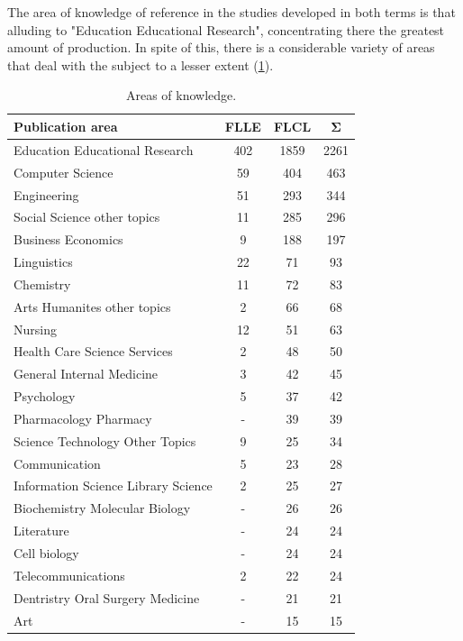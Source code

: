 \documentclass{textolivre}
\begin{document}
The area of knowledge of reference in the studies developed in both terms is that alluding to "Education Educational Research", concentrating there the greatest amount of production. In spite of this, there is a considerable variety of areas that deal with the subject to a lesser extent (\cref{tbl-tabela-05}).

\begin{table}[htpb]
\caption{Areas of knowledge.}
\label{tbl-tabela-05}
\centering
\begin{tabular}{lccc}
\toprule
\textbf{Publication area} & \textbf{FLLE} & \textbf{FLCL} & \textbf{Σ} \\ 
\midrule
Education Educational Research      & 402 & 1859 & 2261 \\ 
Computer Science                    & 59  & 404  & 463  \\ 
Engineering                         & 51  & 293  & 344  \\ 
Social Science other topics         & 11  & 285  & 296  \\ 
Business Economics                  & 9   & 188  & 197  \\ 
Linguistics                         & 22  & 71   & 93   \\ 
Chemistry                           & 11  & 72   & 83   \\ 
Arts Humanites other topics         & 2   & 66   & 68   \\ 
Nursing                             & 12  & 51   & 63   \\ 
Health Care Science Services        & 2   & 48   & 50   \\ 
General Internal Medicine           & 3   & 42   & 45   \\ 
Psychology                          & 5   & 37   & 42   \\ 
Pharmacology Pharmacy               & -   & 39   & 39   \\ 
Science Technology Other Topics     & 9   & 25   & 34   \\ 
Communication                       & 5   & 23   & 28   \\ 
Information Science Library Science & 2   & 25   & 27   \\ 
Biochemistry Molecular Biology      & -   & 26   & 26   \\ 
Literature                          & -   & 24   & 24   \\ 
Cell biology                        & -   & 24   & 24   \\ 
Telecommunications                  & 2   & 22   & 24   \\ 
Dentristry Oral Surgery Medicine    & -   & 21   & 21   \\ 
Art                                 & -   & 15   & 15   \\ 
\bottomrule
\end{tabular}
\end{table}
\end{document}
